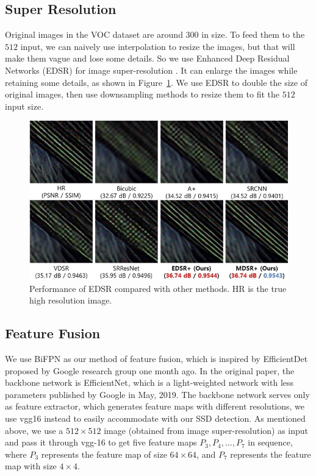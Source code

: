 \documentclass[journal,conference]{IEEEtran}
\begin{document}
\subsection{Super Resolution}
Original images in the VOC dataset are around $300$ in size. To feed them to the $512$ input, we can naively use interpolation to resize the images, but that will make them vague and lose some details. So we use Enhanced Deep Residual Networks (EDSR) for image super-resolution \cite{edsr}. It can enlarge the images while retaining some details, as shown in Figure~\ref{fig:edsr}. We use EDSR to double the size of original images, then use downsampling methods to resize them to fit the $512$ input size.

\begin{figure}[htbp]
  \centering
  \includegraphics[width=\linewidth]{fig/edsr.png}
  \caption{Performance of EDSR compared with other methods. HR is the true high resolution image.}\label{fig:edsr}
\end{figure}

\subsection{Feature Fusion}
We use BiFPN as our method of feature fusion, which is inspired by EfficientDet \cite{EfficientDet} proposed by Google research group one month ago. In the original paper, the backbone network is EfficientNet, which is a light-weighted network with less parameters published by Google in May, 2019. The backbone network serves only as feature extractor, which generates feature maps with different resolutions, we use vgg16 instead to easily accommodate with our SSD detection. As mentioned above, we use a $512\times 512$ image (obtained from image super-resolution) as input and pass it through vgg-16 to get five feature maps $P_3,P_4,\ldots,P_7$ in sequence, where $P_3$ represents the feature map of size $64\times 64$, and $P_7$ represents the feature map with size $4\times 4$.
\end{document}
